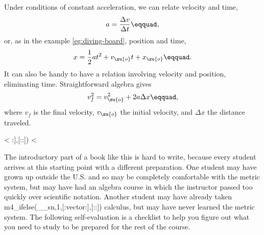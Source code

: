 Under conditions of constant acceleration,
we can relate velocity and time,
\begin{equation*}
  a = \frac{\Delta v}{\Delta t}\eqquad,
\end{equation*}
or, as in the example \ref{eg:diving-board}, position and time,
\begin{equation*}
  x =  \frac{1}{2}at^2 + v_\zu{o} t + x_\zu{o}\eqquad.
\end{equation*}
It can also be handy to have a relation involving velocity and position, eliminating time.
Straightforward algebra gives
\begin{equation*}
  v_f^2 = v_\zu{o}^2 + 2 a \Delta x\eqquad,
\end{equation*}
where $v_f$ is the final velocity, $v_\zu{o}$ the initial velocity, and $\Delta x$ the
distance traveled.

\vspace{0mm plus 5mm}


\vspace{0mm plus 5mm}


\vspace{0mm plus 5mm}

<%
:],[::])%
<%

The introductory part of a book like this is hard to write,
because every student arrives at this starting point with a
different preparation. One student may have grown up
outside the U.S. and so may be completely comfortable with
the metric system, but may have had an algebra course in
which the instructor passed too quickly over scientific
notation. Another student may have already taken m4_ifelse(__sn,1,[:vector:],[::]) calculus,
but may have never learned the metric system. The following
self-evaluation is a checklist to help you figure out what
you need to study to be prepared for the rest of the course.


